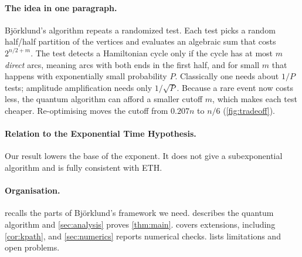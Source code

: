 \documentclass[11pt,a4paper]{article}
\theoremstyle{plain}
\theoremstyle{remark}
\begin{document}
\paragraph{The idea in one paragraph.}
Björklund's algorithm repeats a randomized test. Each test picks a random half/half partition of the vertices and evaluates an algebraic sum that costs $2^{n/2+m}$. The test detects a Hamiltonian cycle only if the cycle has at most $m$ \emph{direct} arcs, meaning arcs with both ends in the first half, and for small $m$ that happens with exponentially small probability $P$. Classically one needs about $1/P$ tests; amplitude amplification needs only $1/\sqrt{P}$. Because a rare event now costs less, the quantum algorithm can afford a smaller cutoff $m$, which makes each test cheaper. Re-optimising moves the cutoff from $0.207n$ to $n/6$ (\cref{fig:tradeoff}).

\paragraph{Relation to the Exponential Time Hypothesis.}
Our result lowers the base of the exponent. It does not give a subexponential algorithm and is fully consistent with ETH.

\paragraph{Organisation.}
 recalls the parts of Björklund's framework we need.  describes the quantum algorithm and \cref{sec:analysis} proves \cref{thm:main}.  covers extensions, including \cref{cor:kpath}, and \cref{sec:numerics} reports numerical checks.  lists limitations and open problems.
\end{document}
